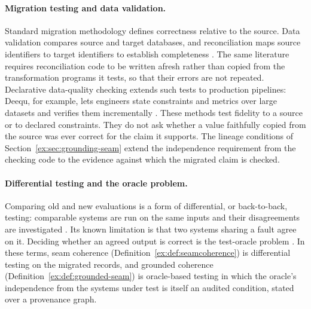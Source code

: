 \documentclass[11pt]{article}
\theoremstyle{definition}
\begin{document}
\paragraph{Migration testing and data validation.} Standard migration methodology defines correctness relative to the source. Data validation compares source and target databases, and reconciliation maps source identifiers to target identifiers to establish completeness \citep{matthesschulzhaller2011}. The same literature requires reconciliation code to be written afresh rather than copied from the transformation programs it tests, so that their errors are not repeated. Declarative data-quality checking extends such tests to production pipelines: Deequ, for example, lets engineers state constraints and metrics over large datasets and verifies them incrementally \citep{schelter2018}. These methods test fidelity to a source or to declared constraints. They do not ask whether a value faithfully copied from the source was ever correct for the claim it supports. The lineage conditions of Section~\ref{ex:sec:grounding-seam} extend the independence requirement from the checking code to the evidence against which the migrated claim is checked.

\paragraph{Differential testing and the oracle problem.} Comparing old and new evaluations is a form of differential, or back-to-back, testing: comparable systems are run on the same inputs and their disagreements are investigated \citep{mckeeman1998}. Its known limitation is that two systems sharing a fault agree on it. Deciding whether an agreed output is correct is the test-oracle problem \citep{barr2015}. In these terms, seam coherence (Definition~\ref{ex:def:seamcoherence}) is differential testing on the migrated records, and grounded coherence (Definition~\ref{ex:def:grounded-seam}) is oracle-based testing in which the oracle's independence from the systems under test is itself an audited condition, stated over a provenance graph.
\end{document}
